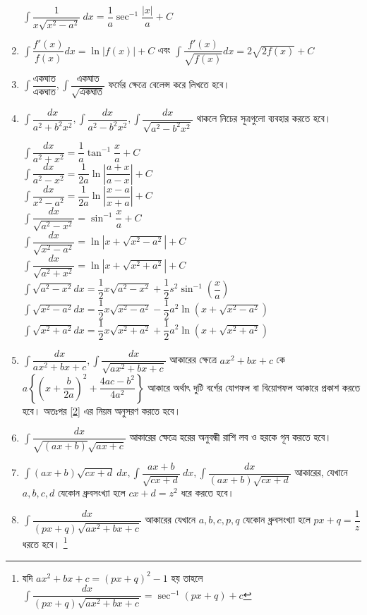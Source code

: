 \documentclass[a4paper,12pt]{article}
\newcommand{\dd}{\displaystyle}
\newcommand{\lt}{\left}
\newcommand{\rt}{\right}
\newcommand{\tm}{\item}
\begin{document}
\begin{enumerate}[ wide=0em, label=\textenglish{\textbf{ Type: \arabic*.}}, itemsep=0pt, parsep=1ex]
\begin{multicols}{2}
            $\dd \int \dfrac{1}{x\sqrt{x^2-a^2}} \ dx = \dfrac{1}{a} \sec ^{-1} \dfrac{|x|}{a} +C$
        \end{multicols}
    \tm $\dd \int \dfrac{f'(x)}{f(x)}dx=\ln|f(x)|+C$ এবং $\dd \int \dfrac{f'(x)}{\sqrt{f(x)}}dx=2\sqrt{2f(x)}+C$
    \tm $\dd \int \dfrac{\text{একঘাত}}{\text{একঘাত}}, \int \dfrac{\text{একঘাত}}{\sqrt{\text{একঘাত}}}$ ফর্মের ক্ষেত্রে বেলেন্স করে লিখতে হবে। 
    \tm $\dd \int \dfrac{dx}{a^2+b^2x^2}, \int \dfrac{dx}{a^2-b^2x^2}, \int \dfrac{dx}{\sqrt{a^2-b^2x^2}}$ থাকলে নিচের সূত্রগুলো ব্যবহার করতে হবে। \label{2}
    \begin{multicols}{2}
        $\dd \int \dfrac{dx}{a^2+x^2} = \dfrac{1}{a} \tan ^{-1} \dfrac{x}{a}+C$\\
        $\dd \int \dfrac{dx}{a^2-x^2} = \dfrac{1}{2a} \ln \lt| \dfrac{a+x}{a-x} \rt|+C$\\
        $\dd \int \dfrac{dx}{x^2-a^2} = \dfrac{1}{2a} \ln \lt| \dfrac{x-a}{x+a} \rt|+C$\\
        $\dd \int \dfrac{dx}{\sqrt{a^2-x^2}} = \sin^{-1} \dfrac{x}{a} + C$\\
        $\dd \int \dfrac{dx}{\sqrt{x^2-a^2}} = \ln \lt| x+ \sqrt{x^2-a^2}\rt| + C$\\
        $\dd \int \dfrac{dx}{\sqrt{a^2+x^2}} = \ln \lt| x+ \sqrt{x^2+a^2}\rt| + C$\\
        $\dd \int \sqrt{a^2-x^2}  dx = \dfrac{1}{2}x\sqrt{a^2-x^2} + \dfrac{1}{2}s^2 \sin^{-1} \lt( \dfrac{x}{a}\rt)$\\
        $\dd \int \sqrt{x^2-a^2}  dx = \dfrac{1}{2} x\sqrt{x^2-a^2}-\dfrac{1}{2} a^2 \ln \lt(x+\sqrt{x^2-a^2}\rt)$ \\
        $\dd \int \sqrt{x^2+a^2}  dx = \dfrac{1}{2} x\sqrt{x^2+a^2}+\dfrac{1}{2} a^2 \ln \lt(x+\sqrt{x^2+a^2}\rt)$ 
    \end{multicols}
    \tm $\dd \int \dfrac{dx}{ax^2+bx+c}, \int \dfrac{dx}{\sqrt{ax^2+bx+c}}$ আকারের ক্ষেত্রে $ax^2+bx+c$ কে $a\lt\{\lt(x+\dfrac{b}{2a}\rt)^2+\dfrac{4ac-b^2}{4a^2}\rt\}$ আকারে অর্থাৎ দুটি বর্গের যোগফল বা বিয়োগফল আকারে প্রকাশ করতে হবে। অতঃপর \ref{2} এর নিয়ম অনুসরণ করতে হবে। 
    \tm $\dd \int \dfrac{dx}{\sqrt{(ax+b)}\sqrt{ax+c}}$ আকারের ক্ষেত্রে হরের অনুবন্ধী রাশি লব ও হরকে গূন করতে হবে। 
    \tm $\dd \int (ax+b)\sqrt{cx+d} \ dx, \int \dfrac{ax+b}{\sqrt{cx+d}} \ dx, \int \dfrac{dx}{(ax+b)\sqrt{cx+d}}$ আকারের, যেখানে $a,b,c,d$ যেকোন ধ্রুবসংখ্যা হলে $cx+d=z^2$ ধরে করতে হবে। 
    \tm $\dd \int \dfrac{dx}{(px+q)\sqrt{ax^2+bx+c}}$ আকারের যেখানে $a,b,c,p,q$ যেকোন ধ্রুবসংখ্যা হলে $px+q=\dfrac{1}{z}$ ধরতে হবে। \footnote{যদি $ax^2+bx+c=(px+q)^2-1$ হয় তাহলে $\dd \int \dfrac{dx}{(px+q)\sqrt{ax^2+bx+c}}=\sec^{-1}(px+q)+c$}

\end{enumerate}
\end{document}
